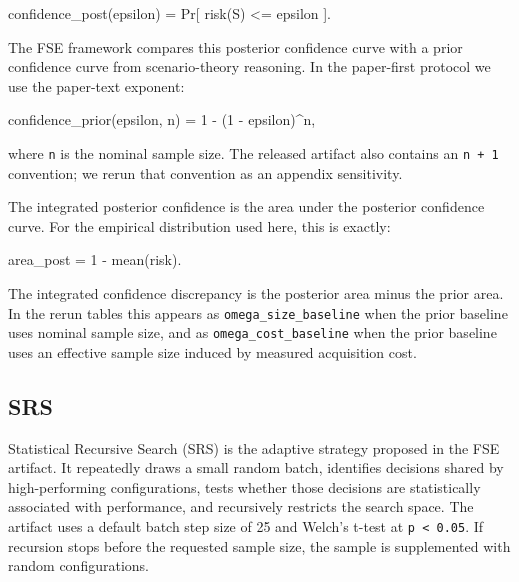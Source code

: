 \documentclass[smallcondensed]{svjour3}
\newenvironment{Shaded}{}{}
\newcommand{\NormalTok}[1]{#1}
\begin{document}
\begin{Shaded}
\begin{Highlighting}[]
\NormalTok{confidence\_post(epsilon) = Pr[ risk(S) \textless{}= epsilon ].}
\end{Highlighting}
\end{Shaded}

The FSE framework compares this posterior confidence curve with a prior
confidence curve from scenario-theory reasoning. In the paper-first
protocol we use the paper-text exponent:

\begin{Shaded}
\begin{Highlighting}[]
\NormalTok{confidence\_prior(epsilon, n) = 1 {-} (1 {-} epsilon)\^{}n,}
\end{Highlighting}
\end{Shaded}

where \texttt{n} is the nominal sample size. The released artifact also
contains an \texttt{n\ +\ 1} convention; we rerun that convention as an
appendix sensitivity.

The integrated posterior confidence is the area under the posterior
confidence curve. For the empirical distribution used here, this is
exactly:

\begin{Shaded}
\begin{Highlighting}[]
\NormalTok{area\_post = 1 {-} mean(risk).}
\end{Highlighting}
\end{Shaded}

The integrated confidence discrepancy is the posterior area minus the
prior area. In the rerun tables this appears as
\texttt{omega\_size\_baseline} when the prior baseline uses nominal
sample size, and as \texttt{omega\_cost\_baseline} when the prior
baseline uses an effective sample size induced by measured acquisition
cost.

\subsection{SRS}\label{srs}

Statistical Recursive Search (SRS) is the adaptive strategy proposed in
the FSE artifact. It repeatedly draws a small random batch, identifies
decisions shared by high-performing configurations, tests whether those
decisions are statistically associated with performance, and recursively
restricts the search space. The artifact uses a default batch step size
of 25 and Welch's t-test at \texttt{p\ \textless{}\ 0.05}. If recursion
stops before the requested sample size, the sample is supplemented with
random configurations.
\end{document}
